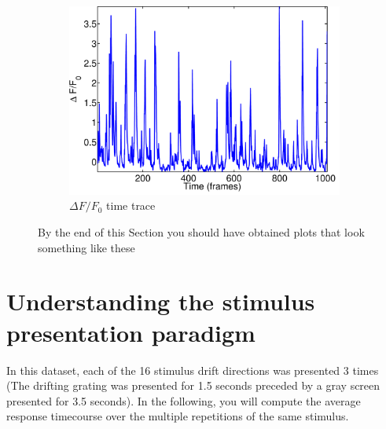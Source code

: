 \documentclass[paper=a4, fontsize=11pt]{article} %
\numberwithin{equation}{section} %
\numberwithin{figure}{section} %
\numberwithin{table}{section} %
\begin{document}
\begin{figure}
\begin{subfigure}[b]{0.3\textwidth}
    \includegraphics[width=\textwidth]{trace_delta_f_f0.pdf}
    \caption{$\Delta F/F_0$ time trace}
    \label{fig:time_trace_dff0}
    \end{subfigure}
    \caption{By the end of this Section you should have obtained plots that look something like these}
\end{figure}


\section{Understanding the stimulus presentation paradigm}

In this dataset, each of the 16 stimulus drift directions was presented 3 times (The drifting grating was presented for 1.5 seconds preceded by a gray screen presented for 3.5 seconds).
In the following, you will compute the average response timecourse over the multiple repetitions of the same stimulus.
\end{document}
